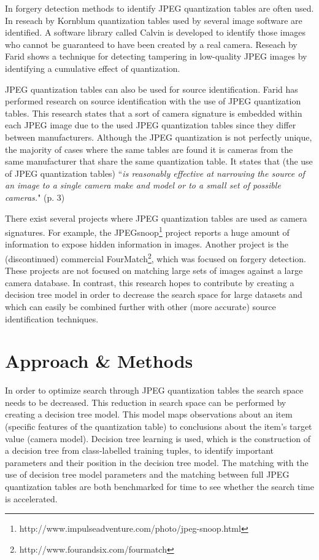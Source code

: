 \documentclass[a4paper,8pt]{article}
\begin{document}
In forgery detection methods to identify JPEG quantization tables are often used. In reseach by Kornblum\cite{kornblum2008using} quantization tables used by several image software are identified. A software library called Calvin is developed to identify those images who cannot
be guaranteed to have been created by a real camera. Reseach by Farid\cite{4773149} shows a technique for detecting tampering in low-quality JPEG images by identifying a cumulative effect of quantization.

JPEG quantization tables can also be used for source identification. Farid has performed research\cite{farid1}\cite{farid2008digital} on source identification with the use of JPEG quantization tables. This research states that a sort of camera signature is embedded within each JPEG image due to the used JPEG quantization tables since they differ between manufacturers. Although the JPEG quantization is not perfectly unique, the majority of cases where the same tables are found it is cameras from the same manufacturer that share the same quantization table. It states that (the use of JPEG quantization tables) ``\textit{is reasonably effective at narrowing the source of an image to a single camera make and model or to a small set of possible cameras.}" (p. 3)

There exist several projects where JPEG quantization tables are used as camera signatures. For example, the JPEGsnoop\footnote{http://www.impulseadventure.com/photo/jpeg-snoop.html} project reports a huge amount of information to expose hidden information in images. Another project is the (discontinued) commercial FourMatch\footnote{http://www.fourandsix.com/fourmatch}, which was focused on forgery detection. These projects are not focused on matching large sets of images against a large camera database. In contrast, this research hopes to contribute by creating a decision tree model in order to decrease the search space for large datasets and which can easily be combined further with other (more accurate) source identification techniques. 

\section*{Approach \& Methods}

In order to optimize search through JPEG quantization tables the search space needs to be decreased. This reduction in search space can be performed by creating a decision tree model. This model maps observations about an item (specific features of the quantization table) to conclusions about the item's target value (camera model). Decision tree learning is used, which is the construction of a decision tree from class-labelled training tuples, to identify important parameters and their position in the decision tree model. The matching with the use of decision tree model parameters and the matching between full JPEG quantization tables are both benchmarked for time to see whether the search time is accelerated.
\pagebreak
\end{document}
